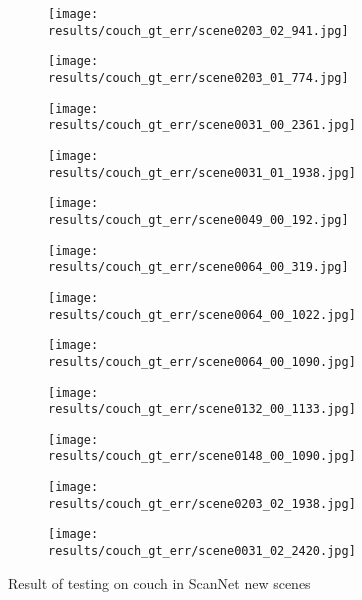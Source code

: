 \begin{figure}[h!]
  \centering
  \begin{subfigure}[b]{0.32\linewidth}
    \texttt{[image: results/couch\_gt\_err/scene0203\_02\_941.jpg]}
  \end{subfigure}
  \begin{subfigure}[b]{0.32\linewidth}
    \texttt{[image: results/couch\_gt\_err/scene0203\_01\_774.jpg]}
  \end{subfigure}
  \begin{subfigure}[b]{0.32\linewidth}
    \texttt{[image: results/couch\_gt\_err/scene0031\_00\_2361.jpg]}
  \end{subfigure}
  \begin{subfigure}[b]{0.32\linewidth}
    \texttt{[image: results/couch\_gt\_err/scene0031\_01\_1938.jpg]}
  \end{subfigure}
  \begin{subfigure}[b]{0.32\linewidth}
    \texttt{[image: results/couch\_gt\_err/scene0049\_00\_192.jpg]}
  \end{subfigure}
  \begin{subfigure}[b]{0.32\linewidth}
    \texttt{[image: results/couch\_gt\_err/scene0064\_00\_319.jpg]}
  \end{subfigure}
  \begin{subfigure}[b]{0.32\linewidth}
    \texttt{[image: results/couch\_gt\_err/scene0064\_00\_1022.jpg]}
  \end{subfigure}
  \begin{subfigure}[b]{0.32\linewidth}
    \texttt{[image: results/couch\_gt\_err/scene0064\_00\_1090.jpg]}
  \end{subfigure}
  \begin{subfigure}[b]{0.32\linewidth}
    \texttt{[image: results/couch\_gt\_err/scene0132\_00\_1133.jpg]}
  \end{subfigure}
  \begin{subfigure}[b]{0.32\linewidth}
    \texttt{[image: results/couch\_gt\_err/scene0148\_00\_1090.jpg]}
  \end{subfigure}
  \begin{subfigure}[b]{0.32\linewidth}
    \texttt{[image: results/couch\_gt\_err/scene0203\_02\_1938.jpg]}
  \end{subfigure}
  \begin{subfigure}[b]{0.32\linewidth}
    \texttt{[image: results/couch\_gt\_err/scene0031\_02\_2420.jpg]}
  \end{subfigure}
  \caption{Result of testing on couch in ScanNet new scenes}
  \label{fig:result_couch_gt_err}
\end{figure}


